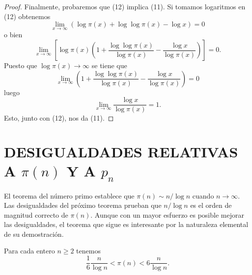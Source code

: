 \documentclass[12pt,a4paper]{book}
\begin{document}
\begin{proof}
        Finalmente, probaremos que (12) implica (11). Si tomamos logaritmos en (12)
        obtenemos
        \begin{equation*}
            \lim_{x\to\infty}(\log\pi(x)+\log\log\pi(x)-\log x)=0
        \end{equation*}
        o bien
        \begin{equation*}
            \lim_{x\to\infty}\left[\log\pi(x)\left(1+\frac{\log\log\pi(x)}{\log\pi(x)}
            -\frac{\log x}{\log\pi(x)}\right)\right]=0.
        \end{equation*}
        Puesto que $\log\pi(x)\to\infty$ se tiene que
        \begin{equation*}
            \lim_{x\to\infty}\left(1+\frac{\log\log\pi(x)}{\log\pi(x)}-\frac{\log x}{\log\pi(x)}\right)=0
        \end{equation*}
        luego
        \begin{equation*}
            \lim_{x\to\infty}\frac{\log x}{\log\pi(x)}=1.
        \end{equation*}
        Esto, junto con (12), nos da (11).
    \end{proof}

    \section{DESIGUALDADES RELATIVAS A \texorpdfstring{$\pi(n)$}{π(n)} Y A \texorpdfstring{$p_n$}{pn}}

    El teorema del número primo establece que $\pi(n)\sim n/\log n$ cuando
    $n\to\infty$. Las desigualdades del próximo teorema prueban que $n/\log n$ es el
    orden de magnitud correcto de $\pi(n)$. Aunque con un mayor esfuerzo es posible
    mejorar las desigualdades, el teorema que sigue es interesante por la naturaleza
    elemental de su demostración.

    \begin{teorema}
        Para cada entero $n\geq2$ tenemos
        \begin{equation}
            \frac{1}{6}\frac{n}{\log n}<\pi(n)<6\frac{n}{\log n}.
        \end{equation}
    \end{teorema}
\end{document}
